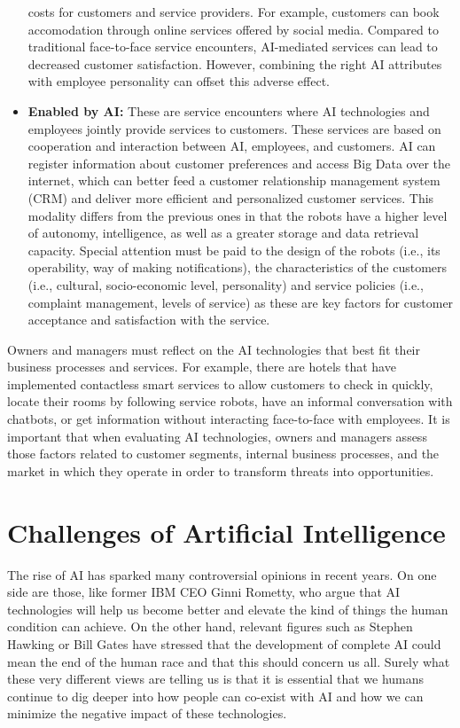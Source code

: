 \documentclass[
  letterpaper,
  DIV=11,
  numbers=noendperiod]{scrreprt}
\begin{document}
\begin{itemize}
  costs for customers and service providers. For example, customers can
  book accomodation through online services offered by social media.
  Compared to traditional face-to-face service encounters, AI-mediated
  services can lead to decreased customer satisfaction. However,
  combining the right AI attributes with employee personality can offset
  this adverse effect.
\item
  \textbf{Enabled by AI:} These are service encounters where AI
  technologies and employees jointly provide services to customers.
  These services are based on cooperation and interaction between AI,
  employees, and customers. AI can register information about customer
  preferences and access Big Data over the internet, which can better
  feed a customer relationship management system (CRM) and deliver more
  efficient and personalized customer services. This modality differs
  from the previous ones in that the robots have a higher level of
  autonomy, intelligence, as well as a greater storage and data
  retrieval capacity. Special attention must be paid to the design of
  the robots (i.e., its operability, way of making notifications), the
  characteristics of the customers (i.e., cultural, socio-economic
  level, personality) and service policies (i.e., complaint management,
  levels of service) as these are key factors for customer acceptance
  and satisfaction with the service.
\end{itemize}

Owners and managers must reflect on the AI technologies that best fit
their business processes and services. For example, there are hotels
that have implemented contactless smart services to allow customers to
check in quickly, locate their rooms by following service robots, have
an informal conversation with chatbots, or get information without
interacting face-to-face with employees. It is important that when
evaluating AI technologies, owners and managers assess those factors
related to customer segments, internal business processes, and the
market in which they operate in order to transform threats into
opportunities.

\hypertarget{challenges-of-artificial-intelligence}{%
\section{Challenges of Artificial
Intelligence}\label{challenges-of-artificial-intelligence}}

The rise of AI has sparked many controversial opinions in recent years.
On one side are those, like former IBM CEO Ginni Rometty, who argue that
AI technologies will help us become better and elevate the kind of
things the human condition can achieve. On the other hand, relevant
figures such as Stephen Hawking or Bill Gates have stressed that the
development of complete AI could mean the end of the human race and that
this should concern us all. Surely what these very different views are
telling us is that it is essential that we humans continue to dig deeper
into how people can co-exist with AI and how we can minimize the
negative impact of these technologies.
\end{document}
